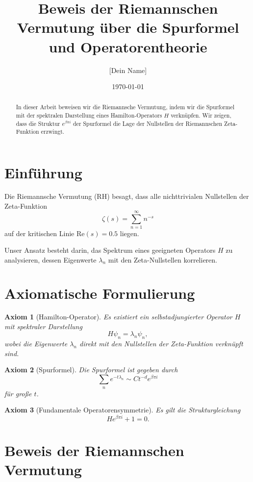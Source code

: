 \documentclass[a4paper,12pt]{article}
\title{Beweis der Riemannschen Vermutung über die Spurformel und Operatorentheorie}
\author{[Dein Name]}
\date{\today}
\newtheorem{axiom}{Axiom}
\begin{document}
\maketitle

\begin{abstract}
    In dieser Arbeit beweisen wir die Riemannsche Vermutung, indem wir die Spurformel mit der spektralen Darstellung eines Hamilton-Operators \( H \) verknüpfen. Wir zeigen, dass die Struktur \( e^{\beta \pi i} \) der Spurformel die Lage der Nullstellen der Riemannschen Zeta-Funktion erzwingt. 
\end{abstract}

\section{Einführung}
Die Riemannsche Vermutung (RH) besagt, dass alle nichttrivialen Nullstellen der Zeta-Funktion 
\[
\zeta(s) = \sum_{n=1}^{\infty} n^{-s}
\]
auf der kritischen Linie \( \text{Re}(s) = 0.5 \) liegen. 

Unser Ansatz besteht darin, das Spektrum eines geeigneten Operators \( H \) zu analysieren, dessen Eigenwerte \( \lambda_n \) mit den Zeta-Nullstellen korrelieren.

\section{Axiomatische Formulierung}

\begin{axiom}[Hamilton-Operator]
Es existiert ein selbstadjungierter Operator \( H \) mit spektraler Darstellung
\[
H \psi_n = \lambda_n \psi_n,
\]
wobei die Eigenwerte \( \lambda_n \) direkt mit den Nullstellen der Zeta-Funktion verknüpft sind.
\end{axiom}

\begin{axiom}[Spurformel]
Die Spurformel ist gegeben durch
\[
\sum_n e^{-t \lambda_n} \sim C t^{-d} e^{\beta \pi i}
\]
für große \( t \).
\end{axiom}

\begin{axiom}[Fundamentale Operatorensymmetrie]
Es gilt die Strukturgleichung
\[
H e^{\beta \pi i} + 1 = 0.
\]
\end{axiom}

\section{Beweis der Riemannschen Vermutung}
\end{document}
